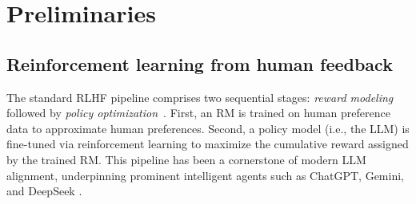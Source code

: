 \documentclass[]{arxiv_singlecolumn}
\theoremstyle{plain}
\theoremstyle{definition}
\theoremstyle{remark}
\begin{document}
\section{Preliminaries}

\subsection{Reinforcement learning from human feedback}\label{sec:rlhf}
The standard RLHF pipeline comprises two sequential stages: \textit{reward modeling} followed by \textit{policy optimization}~\citep{rlhf}. First, an RM is trained on human preference data to approximate human preferences. Second, a policy model (i.e., the LLM) is fine-tuned via reinforcement learning to maximize the cumulative reward assigned by the trained RM. This pipeline has been a cornerstone of modern LLM alignment, underpinning prominent intelligent agents such as ChatGPT, Gemini, and DeepSeek \citep{achiam2023gpt, comanici2025gemini, guo2025deepseek}.
\end{document}
